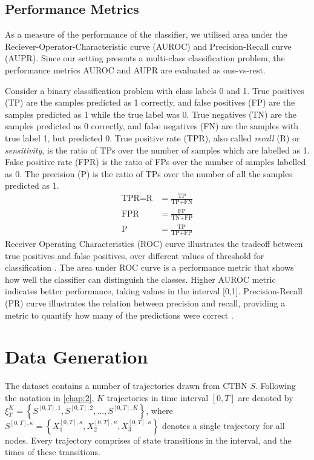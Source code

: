 \subsection{Performance Metrics}
As a measure of the performance of the classifier, we utilised area under the Reciever-Operator-Characteristic curve (AUROC) and Precision-Recall curve (AUPR). Since our setting presents a multi-class classification problem, the
performance metrics AUROC and AUPR are evaluated as one-vs-rest.\par
Consider a binary classification problem with class labels 0 and 1. True positives (TP) are the samples predicted as 1 correctly, and false positives (FP) are the samples predicted as 1 while the true label was 0. True negatives (TN) are the samples predicted as 0 correctly, and false negatives (FN) are the samples with true label 1, but predicted 0. True positive rate (TPR), also called \textit{recall} (R) or \textit{sensitivity}, is the ratio of TPs over the number of samples which are labelled as 1. False positive rate (FPR) is the ratio of FPs over the number of samples labelled as 0. The precision (P) is the ratio of TPs over the number of all the samples predicted as 1.
\begin{align}
\text{TPR} = \text{R} &= \frac{\text{TP}}{\text{TP} + \text{FN}} \\
\text{FPR} &= \frac{\text{FP}}{\text{TN} + \text{FP}} \\
\text{P} &= \frac{\text{TP}}{\text{TP} + \text{FP}}
\end{align}
Receiver Operating Characteristics (ROC) curve illustrates the tradeoff between true positives and false positives, over different values of threshold for classification \cite{kerekes2008receiver}. The area under ROC curve is a performance metric that shows how well the classifier can distinguish the classes. Higher AUROC metric indicates better performance, taking values in the interval [0,1]. Precision-Recall (PR) curve illustrates the relation between precision and recall, providing a metric to quantify how many of the predictions were correct \cite{Boyd2013}.
\section{Data Generation}
The dataset contains a number of trajectories drawn from CTBN $ S $. Following the notation in \cref{chap:2}, $ K $ trajectories in time interval $ [0, T] $ are denoted by $ \xi^{K}_T = \left\lbrace S^{[0,T], 1}, S^{[0,T], 2}, ..., S^{[0,T], K} \right\rbrace  $, where $ S^{[0,T],\kappa} = \left\lbrace X_1^{[0,T],\kappa} , X_2^{[0,T],\kappa}, X_3^{[0,T],\kappa}\right\rbrace $ denotes a single trajectory for all nodes. Every trajectory comprises of state transitions in the interval, and the times of these transitions. 
